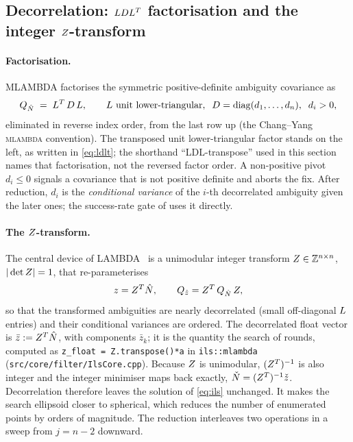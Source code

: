 \documentclass[main.tex]{subfiles}
\begin{document}
\subsection{Decorrelation: $LDL^{T}$ factorisation and the integer
$Z$-transform}\label{sec:ar-lambda}

\paragraph{Factorisation.}
\textsc{MLAMBDA} factorises the symmetric positive-definite ambiguity
covariance as
\begin{equation}
Q_{\hat N} \;=\; L^{T}\,D\,L,
\qquad
L \text{ unit lower-triangular},\;\;
D = \operatorname{diag}(d_1,\dots,d_n),\;\; d_i > 0,
\label{eq:ldlt}
\end{equation}
eliminated in reverse index order, from the last row up (the Chang--Yang
\textsc{mlambda} convention).  The transposed unit
lower-triangular factor stands on the left, as written in
\eqref{eq:ldlt}; the shorthand ``LDL-transpose'' used in this section
names that factorisation, not the reversed factor order.  A
non-positive pivot $d_i \le 0$ signals a covariance that is not positive
definite and aborts the fix.  After reduction, $d_i$ is the
\emph{conditional variance} of the $i$-th decorrelated ambiguity given
the later ones; the success-rate gate of  uses it
directly.

\paragraph{The $Z$-transform.}
The central device of \textsc{LAMBDA}~\cite{teunissen1995lambda} is a
unimodular integer transform $Z \in \mathbb{Z}^{n\times n}$,
$|\det Z| = 1$, that re-parameterises
\begin{equation}
z = Z^{T}\hat{N},
\qquad
Q_{\hat z} = Z^{T}\,Q_{\hat N}\,Z,
\label{eq:ztransform}
\end{equation}
so that the transformed ambiguities are nearly decorrelated (small
off-diagonal $L$ entries) and their conditional variances are
ordered.  The decorrelated float vector is
$\bar{z} := Z^{T}\hat{N}$, with components $\bar{z}_k$; it
is the quantity the search of  rounds, computed as
\texttt{z\_float = Z.transpose()*a} in \texttt{ils::mlambda}
(\texttt{src/core/filter/IlsCore.cpp}).  Because $Z$ is unimodular,
$(Z^{T})^{-1}$ is also integer and the integer minimiser maps back
exactly, $\check{N} = (Z^{T})^{-1}\check{z}$.  Decorrelation
therefore leaves the solution of \eqref{eq:ils} unchanged.  It makes the
search ellipsoid closer to spherical, which reduces the number of
enumerated points by orders of magnitude.  The reduction interleaves two
operations in a sweep from $j = n-2$ downward.
\end{document}
